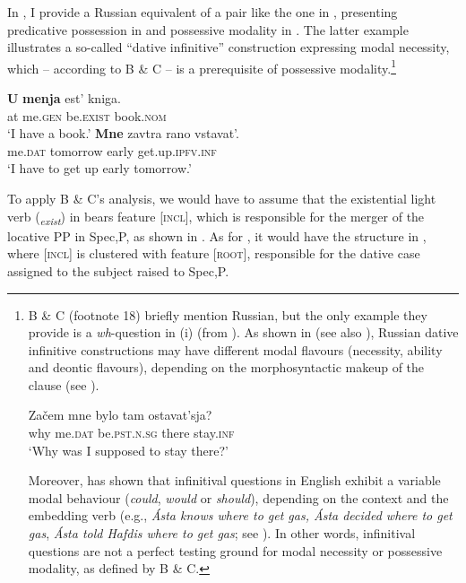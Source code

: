 \documentclass[output=paper,colorlinks,citecolor=brown,nonflat]{./langscibook}
\begin{document}
In , I provide a Russian equivalent of a pair like the one in , presenting predicative possession in  and possessive modality in . The latter example illustrates a so-called “dative infinitive” construction expressing modal necessity, which – according to B \& C – is a prerequisite of possessive modality.\footnote{B \& C (footnote 18) briefly mention Russian, but the only example they provide is a \textit{wh}{}-question in (i) (from \citealt[105]{Jung2011}). As shown in \citet{Tsedryk2018} (see also \citealt{Fortuin2007}), Russian dative infinitive constructions may have different modal flavours (necessity, ability and deontic flavours), depending on the morphosyntactic makeup of the clause (see ).

\ea%
    \gll    Začem  mne       bylo          tam     ostavat’sja?\\
            why     me.\textsc{dat}   be.\textsc{pst.n.sg}  there   stay.\textsc{inf}\\
    \glt    ‘Why was I supposed to stay there?’      
\z    

Moreover, \citet[ch. 4]{Bhatt2006} has shown that infinitival questions in English exhibit a variable modal behaviour (\textit{could}, \textit{would} or \textit{should}), depending on the context and the embedding verb (e.g., \textit{Ásta knows where to get gas, Ásta decided where to get gas}, \textit{Ásta told Hafdis where to get gas}; see \citealt[124]{Bhatt2006}). In other words, infinitival questions are not a perfect testing ground for modal necessity or possessive modality, as defined by B \& C.} 

\ea%
    \label{ex:tsedryk:6}
    \ea\label{ex:tsedryk:6a}
    \gll    \textbf{U}  \textbf{menja}     {est’}           {kniga}.\\
            at  me.\textsc{gen}   be.\textsc{exist}    book.\textsc{nom}\\
    \glt    ‘I have a book.’
    \ex\label{ex:tsedryk:6b}
    \gll    \textbf{{Mne}}      {zavtra}       {rano}   {vstavat’}.\\
            me.\textsc{dat}  tomorrow  early  get.up.\textsc{ipfv.inf}\\
    \glt    ‘I have to get up early tomorrow.’ \hfill \citep[ex. (20a)]{Tsedryk2018}  
    \z
\z

To apply B \& C’s analysis, we would have to assume that the existential light verb (\liv \textit{\textsubscript{exist}}) in  bears feature [\textsc{incl}], which is responsible for the merger of the locative PP in Spec,\liv P, as shown in . As for , it would have the structure in , where [\textsc{incl}] is clustered with feature [\textsc{root}], responsible for the dative case assigned to the subject raised to Spec,\liv P.
\end{document}

